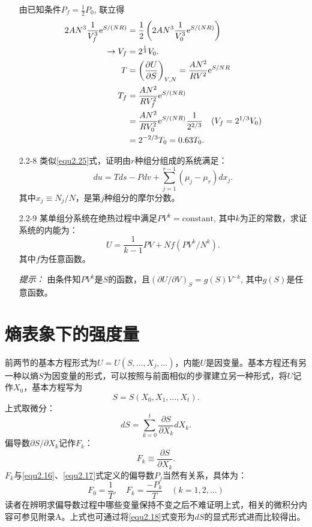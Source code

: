 \begin{enumerate}
{			由已知条件$P_f = \frac{1}{2} P_0$, 联立得
			\begin{align*}
				2AN^3 \frac{1}{V_f^3} \mathrm{e}^{S  /(NR)} &= \frac{1}{2} \left( 2AN^3 \frac{1}{V_0^3} \mathrm{e}^{S / (NR)} \right) \\
				\to V_f &= 2^{\frac{1}{3}} V_0. \\
				T &= \left( \frac{\partial U}{\partial S} \right)_{V, N} = \frac{A N^2}{R V^2} \mathrm{e}^{S / NR} \\
				T_f &= \frac{A N^2}{R V_f^2} \mathrm{e}^{S / (NR)} \\
				&= \frac{A N^2}{R V_0^2} \mathrm{e}^{S / (NR)} \frac{1}{2^{2/3}} \quad(V_f = 2^{1/3} V_0) \\
				&= 2^{-2/3} T_0 = 0.63 T_0.
			\end{align*}
		}
		\item[2.2-8]
			类似\eqref{equ2.25}式，证明由$r$种组分组成的系统满足：
			\[
				du = Tds - Pdv + \sum_{j = 1}^{r - 1} (\mu_j - \mu_r) dx_j.
			\]
			其中$x_j \equiv N_j / N$，是第$j$种组分的摩尔分数。
		\item[2.2-9]
			某单组分系统在绝热过程中满足$PV^k = \mathrm{constant}$, 其中$k$为正的常数，求证系统的内能为：
			\[
				U = \frac{1}{k - 1} PV + Nf(PV^k / N^k).
			\]
			其中$f$为任意函数。

			{\it 提示：} 由条件知$PV^k$是$S$的函数，且$(\partial U / \partial V)_S = g(S) V^{-k}$, 其中$g(S)$是任意函数。	
\end{enumerate}

\section{熵表象下的强度量}
\label{sec2.3}
前两节的基本方程形式为$U = U(S, \dots, X_j, \dots)$，内能$U$是因变量。基本方程还有另一种以熵$S$为因变量的形式，可以按照与前面相似的步骤建立另一种形式，将$U$记作$X_0$，基本方程写为
\begin{equation}
\label{equ2.26}
	S = S(X_0, X_1, \dots, X_t).
\end{equation}
上式取微分：
\begin{equation}
\label{equ2.27}
	dS = \sum_{k = 0}^t \frac{\partial S}{\partial X_k} dX_k.
\end{equation}
偏导数$\partial S / \partial X_k$记作$F_k$：
\begin{equation}
\label{equ2.28}
	F_k \equiv \frac{\partial S}{\partial X_k}.
\end{equation}
$F_k$与\eqref{equ2.16}、\eqref{equ2.17}式定义的偏导数$P_j$当然有关系，具体为：
\begin{equation}
\label{equ2.29}
	F_0 = \frac{1}{T}, \quad F_k = \frac{-P_k}{T} \quad (k = 1, 2, \dots)
\end{equation}
读者在辨明求偏导数过程中哪些变量保持不变之后不难证明上式，相关的微积分内容可参见附录A。上式也可通过将\eqref{equ2.18}式变形为$dS$的显式形式进而比较得出。

